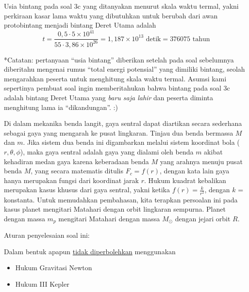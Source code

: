 \documentclass[11pt,fleqn]{exam}
\begin{document}
\begin{questions}
\begin{enumerate}[a.]
    Usia bintang pada soal 3c yang ditanyakan menurut skala waktu termal, yakni perkiraan kasar lama waktu yang dibutuhkan untuk berubah dari awan protobintang menjadi bintang Deret Utama adalah
    \begin{equation*}
        t = \frac{0,5 \cdot 5 \times 10^{41}}{55 \cdot 3,86 \times 10^{26}} = 1,187 \times 10^{13} \text{ detik} = 376075 \text{ tahun}
    \end{equation*}

   *Catatan: pertanyaan ``usia bintang'' diberikan setelah pada soal sebelumnya diberitahu mengenai rumus ``total energi potensial'' yang dimiliki bintang, seolah mengarahkan peserta untuk menghitung skala waktu termal. Asumsi kami sepertinya pembuat soal ingin memberitahukan bahwa bintang pada soal 3c adalah bintang Deret Utama yang \textit{baru saja lahir} dan peserta diminta menghitung lama ia ``dikandungan''. :)
\end{enumerate}


\newpage
\question Di dalam mekanika benda langit, gaya sentral dapat diartikan secara sederhana sebagai gaya yang mengarah ke pusat lingkaran. Tinjau dua benda bermassa $M$ dan $m$. Jika sistem dua benda ini digambarkan melalui sistem koordinat bola ($r, \theta, \phi$), maka gaya sentral adalah gaya yang dialami oleh benda $m$ akibat kehadiran medan gaya karena keberadaan benda $M$ yang arahnya menuju pusat benda $M$, yang secara matematis ditulis $F_c = f(r)$, dengan kata lain gaya hanya merupakan fungsi dari koordinat jarak $r$. Hukum kuadrat kebalikan merupakan kasus khusus dari gaya sentral, yakni ketika $f(r) = \frac{k}{r^2}$, dengan $k$ = konstanta. Untuk memudahkan pembahasan, kita terapkan persoalan ini pada kasus planet mengitari Matahari dengan orbit lingkaran sempurna. Planet dengan massa $m_p$ mengitari Matahari dengan massa $M_\odot$ dengan jejari orbit $R$.

Aturan penyelesaian soal ini:

Dalam bentuk apapun \underline{tidak diperbolehkan} menggunakan
\begin{itemize}
    \item Hukum Gravitasi Newton
    \item Hukum III Kepler
\end{itemize}


\end{questions}
\end{document}
